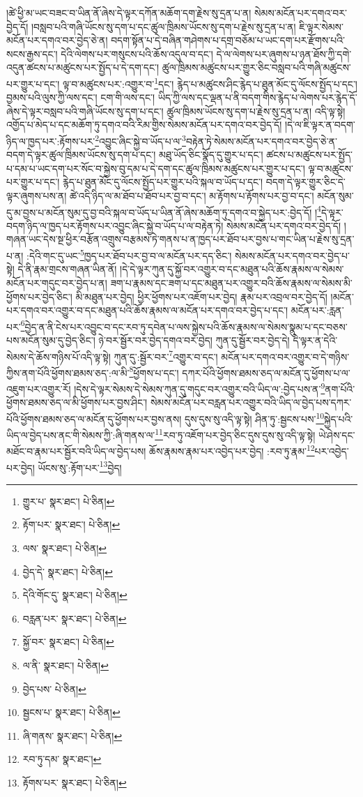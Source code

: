 །ཚེ་ཕྱི་མ་ཡང་བཟང་བ་ཡིན་ནོ་ཞེས་དེ་ལྟར་དཀོན་མཆོག་དག་རྗེས་སུ་དྲན་པ་ན། སེམས་མངོན་པར་དགའ་བར་བྱེད་དོ། །བསླབ་པའི་གཞི་ཡོངས་སུ་དག་པ་དང་ཚུལ་ཁྲིམས་ཡོངས་སུ་དག་པ་རྗེས་སུ་དྲན་པ་ན། ཇི་ལྟར་སེམས་མངོན་པར་དགའ་བར་བྱེད་ཅེ་ན། བདག་སྟོན་པ་དེ་བཞིན་གཤེགས་པ་དགྲ་བཅོམ་པ་ཡང་དག་པར་རྫོགས་པའི་སངས་རྒྱས་དང་། དེའི་ལེགས་པར་གསུངས་པའི་ཆོས་འདུལ་བ་དང་། དེ་ལ་ལེགས་པར་ཞུགས་པ་ཉན་ཐོས་ཀྱི་དགེ་འདུན་ཚངས་པ་མཚུངས་པར་སྤྱོད་པ་དེ་དག་དང་། ཚུལ་ཁྲིམས་མཚུངས་པར་གྱུར་ཅིང་བསླབ་པའི་གཞི་མཚུངས་པར་གྱུར་པ་དང་། ལྟ་བ་མཚུངས་པར་:འགྱུར་བ་\footnote{གྱུར་པ་  སྣར་ཐང་།  པེ་ཅིན། }དང་། རྙེད་པ་མཚུངས་ཤིང་རྙེད་པ་ཐུན་མོང་དུ་ལོངས་སྤྱོད་པ་དང་། བྱམས་པའི་ལུས་ཀྱི་ལས་དང་། ངག་གི་ལས་དང་། ཡིད་ཀྱི་ལས་དང་ལྡན་པ་ནི་བདག་གིས་རྙེད་པ་ལེགས་པར་རྙེད་དོ་ཞེས་དེ་ལྟར་བསླབ་པའི་གཞི་ཡོངས་སུ་དག་པ་དང་། ཚུལ་ཁྲིམས་ཡོངས་སུ་དག་པ་རྗེས་སུ་དྲན་པ་ན། འདི་ལྟ་སྟེ། འགྱོད་པ་མེད་པ་དང་མཆོག་ཏུ་དགའ་བའི་རིམ་གྱིས་སེམས་མངོན་པར་དགའ་བར་བྱེད་དོ། །དེ་ལ་ཇི་ལྟར་ན་བདག་ཉིད་ལ་ཁྱད་པར་:རྟོགས་པར་\footnote{རྟོག་པར་  སྣར་ཐང་།  པེ་ཅིན། }འབྱུང་ཞིང་སྐྱེ་བ་ཡོད་པ་ལ་\footnote{ལས་  སྣར་ཐང་།  པེ་ཅིན། }བརྟེན་ཏེ་སེམས་མངོན་པར་དགའ་བར་བྱེད་ཅེ་ན་བདག་དེ་ལྟར་ཚུལ་ཁྲིམས་ཡོངས་སུ་དག་པ་དང་། མཐུ་ཡོད་ཅིང་སྣོད་དུ་གྱུར་པ་དང་། ཚངས་པ་མཚུངས་པར་སྤྱོད་པ་དམ་པ་ཡང་དག་པར་སོང་བ་སྐྱེས་བུ་དམ་པ་དེ་དག་དང་ཚུལ་ཁྲིམས་མཚུངས་པར་གྱུར་པ་དང་། ལྟ་བ་མཚུངས་པར་གྱུར་པ་དང་། རྙེད་པ་ཐུན་མོང་དུ་ལོངས་སྤྱོད་པར་གྱུར་པའི་སྐལ་བ་ཡོད་པ་དང་། བདག་དེ་ལྟར་གྱུར་ཅིང་དེ་ལྟར་ཞུགས་པས་ན། ཚེ་འདི་ཉིད་ལ་མ་ཐོབ་པ་ཐོབ་པར་བྱ་བ་དང་། མ་རྟོགས་པ་རྟོགས་པར་བྱ་བ་དང་། མངོན་སུམ་དུ་མ་བྱས་པ་མངོན་སུམ་དུ་བྱ་བའི་སྐལ་བ་ཡོད་པ་ཡིན་ནོ་ཞེས་མཆོག་ཏུ་དགའ་བ་སྐྱེད་པར་:བྱེད་དོ། །\footnote{བྱེད་དེ་  སྣར་ཐང་།  པེ་ཅིན། }དེ་ལྟར་བདག་ཉིད་ལ་ཁྱད་པར་རྟོགས་པར་འབྱུང་ཞིང་སྐྱེ་བ་ཡོད་པ་ལ་བརྟེན་ཏེ། སེམས་མངོན་པར་དགའ་བར་བྱེད་དོ། །གཞན་ཡང་དེས་སྔ་ཕྱིར་བརྩོན་འགྲུས་བརྩམས་ཏེ་གནས་པ་ན་ཁྱད་པར་ཐོབ་པར་བྱས་པ་གང་ཡིན་པ་རྗེས་སུ་དྲན་པ་ན། :དེའི་གང་དུ་ཡང་\footnote{དེའི་གོང་དུ་  སྣར་ཐང་།  པེ་ཅིན། }ཁྱད་པར་ཐོབ་པར་བྱ་བ་ལ་མངོན་པར་དད་ཅིང་། སེམས་མངོན་པར་དགའ་བར་བྱེད་པ་སྟེ། དེ་ནི་རྣམ་གྲངས་གཞན་ཡིན་ནོ། །དེ་དེ་ལྟར་ཀུན་དུ་སྐྱོ་བར་འགྱུར་བ་དང་མཐུན་པའི་ཆོས་རྣམས་ལ་སེམས་མངོན་པར་གདུང་བར་བྱེད་པ་ན། ཟག་པ་རྣམས་དང་ཟག་པ་དང་མཐུན་པར་འགྱུར་བའི་ཆོས་རྣམས་ལ་སེམས་མི་ཕྱོགས་པར་བྱེད་ཅིང་། མི་མཐུན་པར་བྱེད། ཕྱིར་ཕྱོགས་པར་འཇོག་པར་བྱེད། རྣམ་པར་འབྲལ་བར་བྱེད་དོ། །མངོན་པར་དགའ་བར་འགྱུར་བ་དང་མཐུན་པའི་ཆོས་རྣམས་ལ་མངོན་པར་དགའ་བར་བྱེད་པ་དང་། མངོན་པར་:རླན་པར་\footnote{བརླན་པར་  སྣར་ཐང་།  པེ་ཅིན། }བྱེད་ན་ནི་ངེས་པར་འབྱུང་བ་དང་རབ་ཏུ་དབེན་པ་ལས་སྐྱེས་པའི་ཆོས་རྣམས་ལ་སེམས་སྣུམ་པ་དང་བཅས་པས་མངོན་སུམ་དུ་བྱེད་ཅིང་། ཉེ་བར་སྦྱོར་བར་བྱེད་དགའ་བར་བྱེད། ཀུན་དུ་སྦྱོར་བར་བྱེད་དེ། དེ་ལྟར་ན་དེའི་སེམས་དེ་ཆོས་གཉིས་པོ་འདི་ལྟ་སྟེ། ཀུན་དུ་:སྦྱོར་བར་\footnote{སྐྱོ་བར་  སྣར་ཐང་།  པེ་ཅིན། }འགྱུར་བ་དང་། མངོན་པར་དགའ་བར་འགྱུར་བ་དེ་གཉིས་ཀྱིས་ནག་པོའི་ཕྱོགས་ཐམས་ཅད་:ལ་མི་\footnote{ལ་ནི་  སྣར་ཐང་།  པེ་ཅིན། }ཕྱོགས་པ་དང་། དཀར་པོའི་ཕྱོགས་ཐམས་ཅད་ལ་མངོན་དུ་ཕྱོགས་པ་ལ་འཇུག་པར་འགྱུར་རོ། །དེས་དེ་ལྟར་སེམས་དེ་སེམས་ཀུན་དུ་གདུང་བར་འགྱུར་བའི་ཡིད་ལ་:བྱེད་པས་ན་\footnote{བྱེད་པས་  པེ་ཅིན། }ནག་པོའི་ཕྱོགས་ཐམས་ཅད་ལ་མི་ཕྱོགས་པར་བྱས་ཤིང་། སེམས་མངོན་པར་བརླན་པར་འགྱུར་བའི་ཡིད་ལ་བྱེད་པས་དཀར་པོའི་ཕྱོགས་ཐམས་ཅད་ལ་མངོན་དུ་ཕྱོགས་པར་བྱས་ནས། དུས་དུས་སུ་འདི་ལྟ་སྟེ། ཤིན་ཏུ་:སྦྱངས་པས་\footnote{སྦྱངས་པ་  སྣར་ཐང་།  པེ་ཅིན། }སྐྱེད་པའི་ཡིད་ལ་བྱེད་པས་ནང་གི་སེམས་ཀྱི་:ཞི་གནས་ལ་\footnote{ཞི་གནས་  སྣར་ཐང་།  པེ་ཅིན། }རབ་ཏུ་འཇོག་པར་བྱེད་ཅིང་དུས་དུས་སུ་འདི་ལྟ་སྟེ། ཡེ་ཤེས་དང་མཐོང་བ་རྣམ་པར་སྦྱོར་བའི་ཡིད་ལ་བྱེད་པས། ཆོས་རྣམས་རྣམ་པར་འབྱེད་པར་བྱེད། :རབ་ཏུ་རྣམ་\footnote{རབ་ཏུ་དམ་  སྣར་ཐང་། }པར་འབྱེད་པར་བྱེད། ཡོངས་སུ་:རྟོག་པར་\footnote{རྟོགས་པར་  སྣར་ཐང་།  པེ་ཅིན། }བྱེད། 